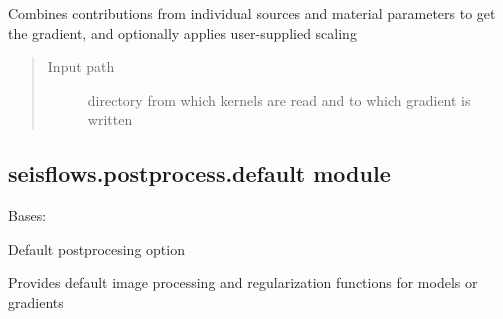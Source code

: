 \documentclass[letterpaper,10pt,english]{sphinxmanual}
\begin{document}
\begin{fulllineitems}
\begin{fulllineitems}
\end{fulllineitems}


\begin{fulllineitems}
\label{\detokenize{ref/seisflows.postprocess:seisflows.postprocess.base.base.write_gradient}}
Combines contributions from individual sources and material parameters
to get the gradient, and optionally applies user-supplied scaling
\begin{quote}\begin{description}
\item[{Input path}] \leavevmode
directory from which kernels are read and to which
gradient is written

\end{description}\end{quote}

\end{fulllineitems}


\end{fulllineitems}



\subsection{seisflows.postprocess.default module}
\label{\detokenize{ref/seisflows.postprocess:module-seisflows.postprocess.default}}\label{\detokenize{ref/seisflows.postprocess:seisflows-postprocess-default-module}}

\begin{fulllineitems}
\label{\detokenize{ref/seisflows.postprocess:seisflows.postprocess.default.default}}
Bases: {\hyperref[\detokenize{ref/seisflows.postprocess:seisflows.postprocess.base.base}]{}}

Default postprocesing option

Provides default image processing and regularization functions for models
or gradients

\end{fulllineitems}
\end{document}
